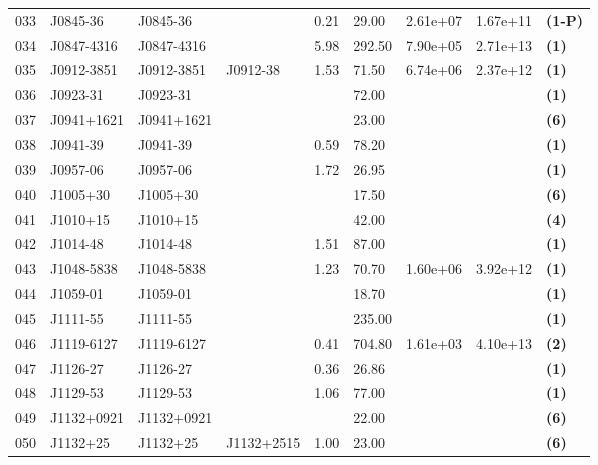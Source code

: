 \documentclass{jaa}
\begin{document}
\begin{table*}
\begin{minipage}{0.95\textwidth}
\begin{tabular}{|l|l|l|l|l|l|l|l|l|}
 033 & J0845-36    & J0845-36    &             &  0.21 &  29.00 &  2.61e+07  & 1.67e+11 &  {\bf (1-P)} \\
 034 & J0847-4316  & J0847-4316  &             &  5.98 & 292.50 &  7.90e+05  & 2.71e+13 &  {\bf (1)}   \\
 035 & J0912-3851  & J0912-3851  &  J0912-38   &  1.53 &  71.50 &  6.74e+06  & 2.37e+12 &  {\bf (1)}   \\
 036 & J0923-31    & J0923-31    &             &       &  72.00 &            &          &  {\bf (1)}   \\ 
 037 & J0941+1621  & J0941+1621  &             &       &  23.00 &            &          &  {\bf (6)}   \\
 038 & J0941-39    & J0941-39    &             &  0.59 &  78.20 &            &          &  {\bf (1)}   \\
 039 & J0957-06    & J0957-06    &             &  1.72 &  26.95 &            &          &  {\bf (1)}   \\
 040 & J1005+30    & J1005+30    &             &       &  17.50 &            &          &  {\bf (6)}   \\ 
 041 & J1010+15    & J1010+15    &             &       &  42.00 &            &          &  {\bf (4)}   \\
 042 & J1014-48    & J1014-48    &             &  1.51 &  87.00 &            &          &  {\bf (1)}   \\
 043 & J1048-5838  & J1048-5838  &             &  1.23 &  70.70 &  1.60e+06  & 3.92e+12 &  {\bf (1)}   \\
 044 & J1059-01    & J1059-01    &             &       &  18.70 &            &          &  {\bf (1)}   \\
 045 & J1111-55    & J1111-55    &             &       & 235.00 &            &          &  {\bf (1)}   \\
 046 & J1119-6127  & J1119-6127  &             &  0.41 & 704.80 & 1.61e+03   & 4.10e+13 &  {\bf (2)}   \\
 047 & J1126-27    & J1126-27    &             &  0.36 &  26.86 &            &          &  {\bf (1)}   \\
 048 & J1129-53    & J1129-53    &             &  1.06 &  77.00 &            &          &  {\bf (1)}   \\
 049 & J1132+0921  & J1132+0921  &             &       &  22.00 &            &          &  {\bf (6)}   \\
 050 & J1132+25    & J1132+25    &  J1132+2515 &  1.00 &  23.00 &            &          &  {\bf (6)}   \\ \bottomrule
\end{tabular}
%
\end{minipage}
%
\label{t_rrat1}
%
\end{table*}
%
\end{document}
